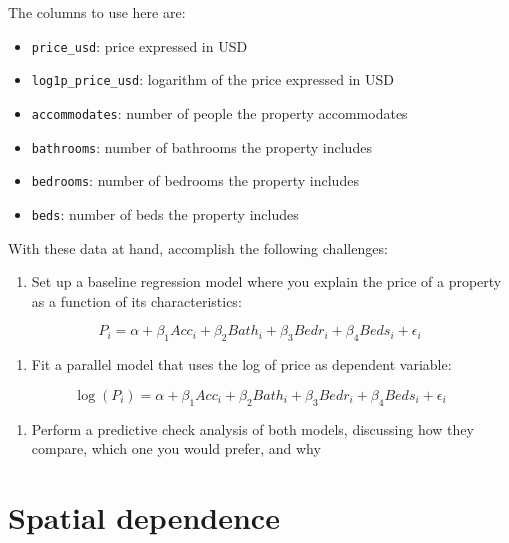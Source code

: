 \documentclass[
  letterpaper,
  krantz2]{style/krantz}
\providecommand{\tightlist}{%
  \setlength{\itemsep}{0pt}\setlength{\parskip}{0pt}}\usepackage{longtable,booktabs,array}
\begin{document}
The columns to use here are:

\begin{itemize}
\tightlist
\item
  \texttt{price\_usd}: price expressed in USD
\item
  \texttt{log1p\_price\_usd}: logarithm of the price expressed in USD
\item
  \texttt{accommodates}: number of people the property accommodates
\item
  \texttt{bathrooms}: number of bathrooms the property includes
\item
  \texttt{bedrooms}: number of bedrooms the property includes
\item
  \texttt{beds}: number of beds the property includes
\end{itemize}

With these data at hand, accomplish the following challenges:

\begin{enumerate}
\def\labelenumi{\arabic{enumi}.}
\tightlist
\item
  Set up a baseline regression model where you explain the price of a
  property as a function of its characteristics:
\end{enumerate}

\[
P_i = \alpha + \beta_1 Acc_i + \beta_2 Bath_i + \beta_3 Bedr_i + \beta_4 Beds_i + \epsilon_i
\]

\begin{enumerate}
\def\labelenumi{\arabic{enumi}.}
\setcounter{enumi}{1}
\tightlist
\item
  Fit a parallel model that uses the log of price as dependent variable:
\end{enumerate}

\[
\log(P_i) = \alpha + \beta_1 Acc_i + \beta_2 Bath_i + \beta_3 Bedr_i + \beta_4 Beds_i + \epsilon_i
\]

\begin{enumerate}
\def\labelenumi{\arabic{enumi}.}
\setcounter{enumi}{2}
\tightlist
\item
  Perform a predictive check analysis of both models, discussing how
  they compare, which one you would prefer, and why
\end{enumerate}

\hypertarget{spatial-dependence-1}{%
\chapter{Spatial dependence}\label{spatial-dependence-1}}
\end{document}
